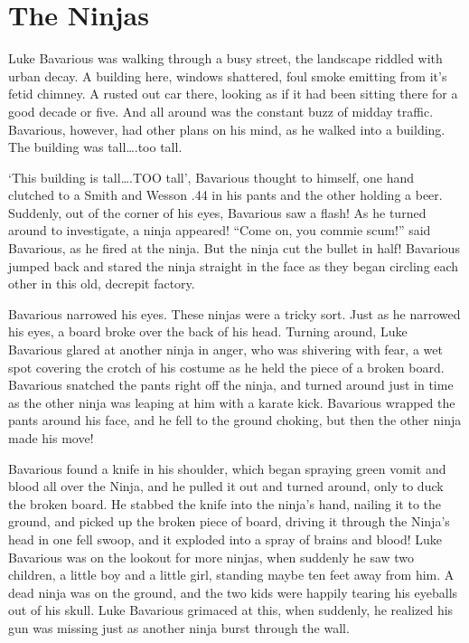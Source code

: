 \chapter{The Ninjas}





Luke Bavarious was walking through a busy street, the landscape
riddled with urban decay. A building here, windows shattered, foul
smoke emitting from it's fetid chimney. A rusted out car
there, looking as if it had been sitting there for a good decade or
five. And all around was the constant buzz of midday traffic.
Bavarious, however, had other plans on his mind, as he walked into
a building. The building was tall{\ldots}.too tall.



`This building is tall{\ldots}.TOO tall', Bavarious
thought to himself, one hand clutched to a Smith and Wesson .44 in
his pants and the other holding a beer. Suddenly, out of the corner
of his eyes, Bavarious saw a flash! As he turned around to
investigate, a ninja appeared! ``Come on, you commie
scum!'' said Bavarious, as he fired at the ninja. But the
ninja cut the bullet in half! Bavarious jumped back and stared the
ninja straight in the face as they began circling each other in
this old, decrepit factory.



Bavarious narrowed his eyes. These ninjas were a tricky sort. Just
as he narrowed his eyes, a board broke over the back of his head.
Turning around, Luke Bavarious glared at another ninja in anger,
who was shivering with fear, a wet spot covering the crotch of his
costume as he held the piece of a broken board. Bavarious snatched
the pants right off the ninja, and turned around just in time as
the other ninja was leaping at him with a karate kick. Bavarious
wrapped the pants around his face, and he fell to the ground
choking, but then the other ninja made his move!



Bavarious found a knife in his shoulder, which began spraying green
vomit and blood all over the Ninja, and he pulled it out and turned
around, only to duck the broken board. He stabbed the knife into
the ninja's hand, nailing it to the ground, and picked up the
broken piece of board, driving it through the Ninja's head in
one fell swoop, and it exploded into a spray of brains and blood!
Luke Bavarious was on the lookout for more ninjas, when suddenly he
saw two children, a little boy and a little girl, standing maybe
ten feet away from him. A dead ninja was on the ground, and the two
kids were happily tearing his eyeballs out of his skull. Luke
Bavarious grimaced at this, when suddenly, he realized his gun was
missing just as another ninja burst through the wall.




